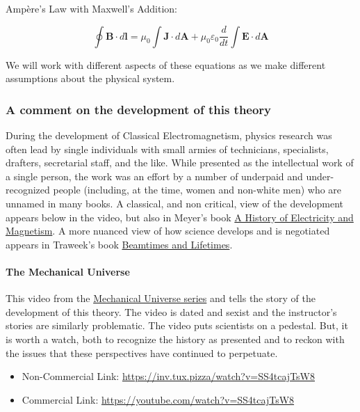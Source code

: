Ampère's Law with Maxwell's Addition:

\[
\oint \mathbf{B} \cdot d\mathbf{l} = \mu_0 \int \mathbf{J} \cdot d\mathbf{A} + \mu_0 \varepsilon_0 \frac{d}{dt} \int \mathbf{E} \cdot d\mathbf{A}
\]

We will work with different aspects of these equations as we make
different assumptions about the physical system.

\subsubsection{A comment on the development of this
theory}\label{a-comment-on-the-development-of-this-theory}

During the development of Classical Electromagnetism, physics research
was often lead by single individuals with small armies of technicians,
specialists, drafters, secretarial staff, and the like. While presented
as the intellectual work of a single person, the work was an effort by a
number of underpaid and under-recognized people (including, at the time,
women and non-white men) who are unnamed in many books. A classical, and
non critical, view of the development appears below in the video, but
also in Meyer's book
\href{https://mitpress.mit.edu/9780262130707/a-history-of-electricity-and-magnetism/}{A
History of Electricity and Magnetism}. A more nuanced view of how
science develops and is negotiated appears in Traweek's book
\href{https://en.wikipedia.org/wiki/Beamtimes_and_Lifetimes}{Beamtimes
and Lifetimes}.

\paragraph{The Mechanical Universe}\label{the-mechanical-universe}

This video from the
\href{https://en.wikipedia.org/wiki/The_Mechanical_Universe}{Mechanical
Universe series} and tells the story of the development of this theory.
The video is dated and sexist and the instructor's stories are similarly
problematic. The video puts scientists on a pedestal. But, it is worth a
watch, both to recognize the history as presented and to reckon with the
issues that these perspectives have continued to perpetuate.

\href{https://inv.tux.pizza/watch?v=SS4tcajTsW8}{\pandocbounded{\texttt{[image: https://markdown-videos-api.jorgenkh.no/youtube/SS4tcajTsW8?width=720\&height=405]}}}

\begin{itemize}
\tightlist
\item
  Non-Commercial Link: \url{https://inv.tux.pizza/watch?v=SS4tcajTsW8}
\item
  Commercial Link: \url{https://youtube.com/watch?v=SS4tcajTsW8}
\end{itemize}
